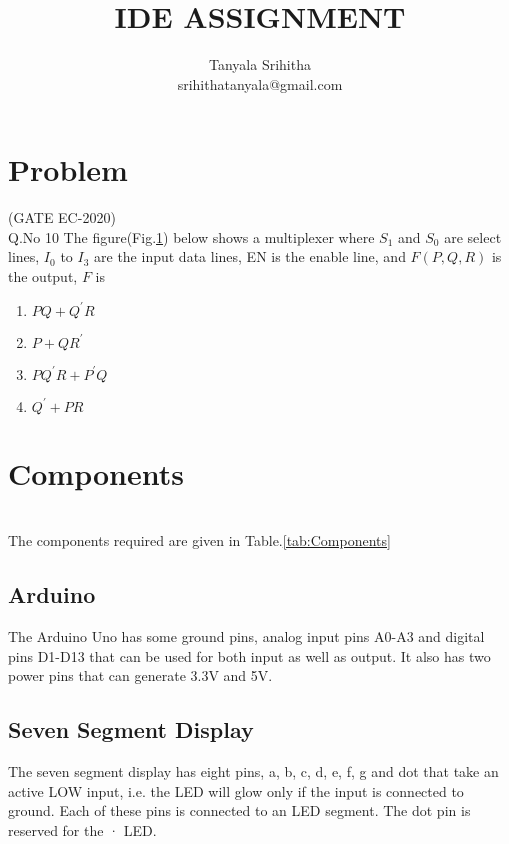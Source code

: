 \documentclass[journal,twocolumn,10pt, a4paper]{article}
\begin{document}
\lstset{ 
  language=C++,
  basicstyle=\ttfamily\footnotesize,
  breaklines=true,
  frame=lines}


\title{IDE ASSIGNMENT}
\author{Tanyala Srihitha\\srihithatanyala@gmail.com}
\maketitle
\tableofcontents 

\section{Problem}                               
(GATE EC-2020)\\                                  
Q.No 10    The figure(Fig.\ref{fig:Fig 1}) below shows a multiplexer where $S_1$ and $S_0$ are select lines, $I_0$ to $I_3$ are the input data lines, EN is the enable line, and $F(P,Q,R)$ is the output, $F$ is
\begin{figure}[!h]

\caption{}
\label{fig:Fig 1}
\end{figure}

\begin{enumerate}
   \item $PQ +{Q^\prime} R$
   \item $P+Q {R^\prime}$
   \item $P{Q^\prime} R+{P^\prime}Q$
   \item ${Q^\prime} +PR$
\end{enumerate}

\section{Components}\\
The components required are given in Table.\ref{tab:Components}
\begin{table}[!h]
\centering

\caption{}
\label{tab:Components}
\end{table}

\subsection{Arduino}
The Arduino Uno has some ground pins, analog input pins A0-A3 and digital pins D1-D13 that can be used for both input as well as output. It also has two power pins that can generate 3.3V and 5V.
\subsection{Seven Segment Display}
The seven segment display has eight pins, a, b, c, d, e, f, g and dot that take an active LOW input, i.e. the LED will glow only if the input is connected to ground. Each of these pins is connected to an LED segment. The dot pin is reserved for the · LED.
\end{document}
